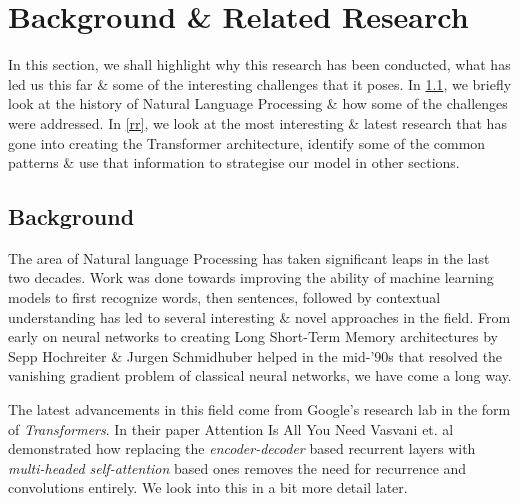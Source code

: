\documentclass[11pt]{article}
\begin{document}
\section{Background \& Related Research}\label{backRR}
In this section, we shall highlight why this research has been conducted, what has led us this far \& some of the interesting challenges that it poses. In \ref{back}, we briefly look at the history of Natural Language Processing \& how some of the challenges were addressed. In \ref{rr}, we look at the most interesting \& latest research that has gone into creating the Transformer architecture, identify some of the common patterns \& use that information to strategise our model in other sections.
\subsection{Background}\label{back}
The area of Natural language Processing has taken significant leaps in the last two decades. Work was done towards improving the ability of machine learning models to first recognize words, then sentences, followed by contextual understanding has led to several interesting \& novel approaches in the field. From early on neural networks to creating Long Short-Term Memory architectures\citep{originallstm} by Sepp Hochreiter \& Jurgen Schmidhuber helped in the mid-'90s that resolved the vanishing gradient problem of classical neural networks, we have come a long way.

The latest advancements in this field come from Google's research lab in the form of \textit{Transformers}. In their paper Attention Is All You Need\citep{atayl} Vasvani et. al demonstrated how replacing the \textit{encoder-decoder} based recurrent layers with \textit{multi-headed self-attention} based ones removes the need for recurrence and convolutions entirely. We look into this in a bit more detail later.\\
\end{document}
